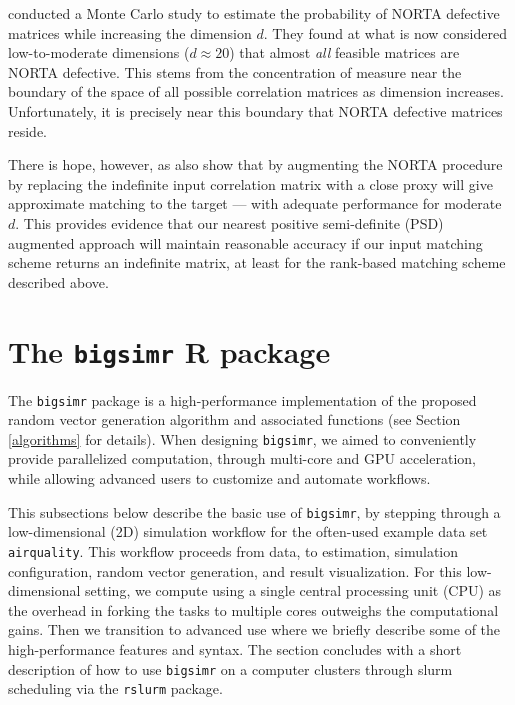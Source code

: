 \documentclass[]{article}
\begin{document}
\citet{GH02} conducted a Monte Carlo study to estimate the probability of NORTA defective matrices while increasing the dimension \(d\).
They found at what is now considered low-to-moderate dimensions (\(d \approx 20\)) that almost \emph{all} feasible matrices are NORTA defective.
This stems from the concentration of measure near the boundary of the space of all possible correlation matrices as dimension increases. Unfortunately, it is precisely near this boundary that NORTA defective matrices reside.

There is hope, however, as \citet{GH02} also show that by augmenting the NORTA procedure by replacing the indefinite input correlation matrix with a close proxy will give approximate matching to the target --- with adequate performance for moderate \(d\).
This provides evidence that our nearest positive semi-definite (PSD) augmented approach will maintain reasonable accuracy if our input matching scheme returns an indefinite matrix, at least for the rank-based matching scheme described above.

\hypertarget{the-bigsimr-r-package}{%
\section{\texorpdfstring{The \texttt{bigsimr} R package}{The bigsimr R package}}\label{the-bigsimr-r-package}}

The \texttt{bigsimr} package is a high-performance implementation of the proposed random vector generation algorithm and associated functions (see Section \ref{algorithms} for details).
When designing \texttt{bigsimr}, we aimed to conveniently provide parallelized computation, through multi-core and GPU acceleration, while allowing advanced users to customize and automate workflows.

This subsections below describe the basic use of \texttt{bigsimr}, by stepping through a low-dimensional (2D) simulation workflow for the often-used example data set \texttt{airquality}.
This workflow proceeds from data, to estimation, simulation configuration, random vector generation, and result visualization.
For this low-dimensional setting, we compute using a single central processing unit (CPU) as the overhead in forking the tasks to multiple cores outweighs the computational gains.
Then we transition to advanced use where we briefly describe some of the high-performance features and syntax.
The section concludes with a short description of how to use \texttt{bigsimr} on a computer clusters through slurm scheduling via the \texttt{rslurm} package.
\end{document}
